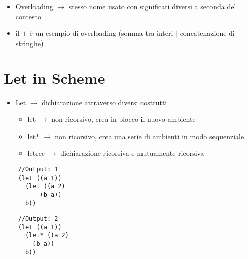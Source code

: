 \documentclass{article}
\begin{document}
\smallskip

\begin{itemize}
  \item Overloading $\rightarrow$ stesso nome usato con significati diversi a seconda del contesto
  \item il $+$ è un esempio di overloading (somma tra interi $\mid$ concatenazione di stringhe)
\end{itemize}

\section*{Let in Scheme}
\begin{itemize}
  \item Let $\rightarrow$ dichiarazione attraverso diversi costrutti
  \begin{itemize}
    \item let $\rightarrow$  non ricorsivo, crea in blocco il nuovo ambiente
    \item let$*$ $\rightarrow$  non ricorsivo, crea una serie di ambienti in modo sequenziale
    \item letrec $\rightarrow$ dichiarazione ricorsiva e mutuamente ricorsiva
  \end{itemize}
\end{itemize}

\begin{multicols}{2}
  \begin{lstlisting}
    //Output: 1
    (let ((a 1))
      (let ((a 2)
          (b a))
      b))
  \end{lstlisting}
  \columnbreak 
  \begin{lstlisting}
    //Output: 2
    (let ((a 1))
      (let* ((a 2)
        (b a))
      b))
  \end{lstlisting}
\end{multicols}

\newpage
\end{document}
